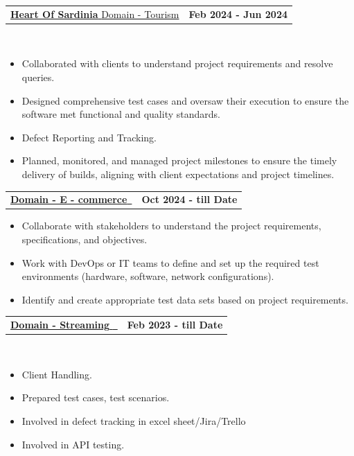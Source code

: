 \documentclass[letterpaper,11pt]{article}
\makeatletter
\newcommand{\resumeItem}[1]{
  \item\small{
    {#1 \vspace{-2pt}}
  }
}
\newcommand{\resumeProjectHeading}[2]{
    \item
    \begin{tabular*}{1.001\textwidth}{l@{\extracolsep{\fill}}r}
      \small#1 & \textbf{\small #2}\\
    \end{tabular*}\vspace{-7pt}
}
\newcommand{\resumeSubHeadingListEnd}{\end{itemize}}
\newcommand{\resumeItemListStart}{\begin{itemize}}
\newcommand{\resumeItemListEnd}{\end{itemize}\vspace{-5pt}}
\makeatother
\begin{document}
{          %
    \resumeProjectHeading
          {\href{https://play.google.com/store/apps/details?id=com.eager.heartofsardinia}{\textbf{\large{\underline{Heart Of Sardinia}}} \href{}{\raisebox{-0.1\height}\faExternalLink }} \large{\underline{Domain - Tourism}}}{Feb 2024 - Jun 2024}\\
          \resumeItemListStart
            \resumeItem {\normalsize {Collaborated with clients to understand project requirements and  resolve queries.}}
            \resumeItem{\normalsize{Designed comprehensive test cases and oversaw their execution to ensure the software met functional and quality standards.}}
            \resumeItem{\normalsize{Defect Reporting and Tracking.}}
            \resumeItem{\normalsize{Planned, monitored, and managed project milestones to ensure the timely delivery of builds, aligning with client expectations and project timelines.}}
          \resumeItemListEnd 
          \vspace{2pt}

        \resumeProjectHeading
          {\href{}{\textbf{\large{\underline{Domain - E - commerce\textbf{}}}}\href{}{\raisebox{-0.1\height}\ }}  \large{\underline{}}}{Oct 2024 - till Date}
          \resumeItemListStart
             \resumeItem{\normalsize{Collaborate with stakeholders to understand the project requirements, specifications, and objectives.}}
            \resumeItem{\normalsize{Work with DevOps or IT teams to define and set up the required test environments (hardware, software, network configurations).}}
            \resumeItem{\normalsize{Identify and create appropriate test data sets based on project requirements.}}
          \resumeItemListEnd
       \vspace{-13pt}
       
      \resumeProjectHeading
          {\href{}{\textbf{\large{\underline{Domain - Streaming\textbf{}}}} \href{}{\raisebox{-0.1\height}\ }} \large{\underline{}}}{Feb 2023 - till Date}\\
          \resumeItemListStart
             \resumeItem{\normalsize{Client Handling.}}
            \resumeItem{\normalsize{Prepared test cases, test scenarios.}}
            \resumeItem{\normalsize{Involved in defect tracking in excel sheet/Jira/Trello}}
            \resumeItem{\normalsize{Involved in API testing.}}
          \resumeItemListEnd
        \vspace{-13pt}
          
}
\end{document}
